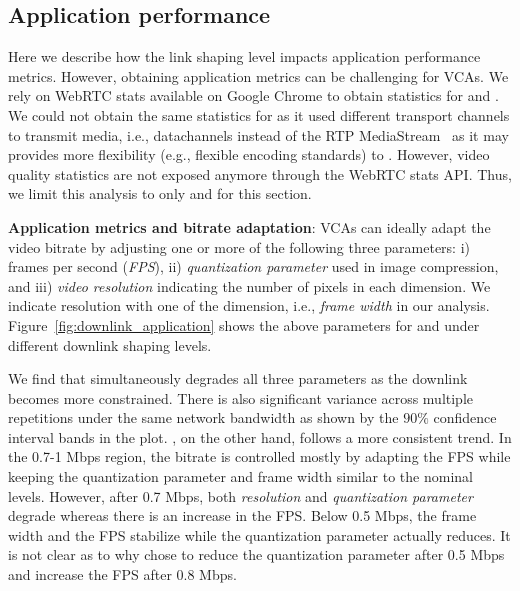 \subsection{Application performance}
Here we describe how the link shaping level impacts application performance metrics. However, obtaining application metrics can be challenging for VCAs. We rely on WebRTC stats available on Google Chrome to obtain statistics for \teamsbrowser and \meet. We could not obtain the same statistics for \zoombrowser as it used different transport channels to transmit media, i.e., datachannels instead of the RTP MediaStream~\cite{webrtc_stats} as it may provides more flexibility (e.g., flexible encoding standards) to \zoom. However, video quality statistics are not exposed anymore through the WebRTC stats API. %
Thus, we limit this analysis to only \meet and \teamsbrowser for this section. 






\textbf{Application metrics and bitrate adaptation}: VCAs can ideally adapt the video bitrate by adjusting one or more of the following three parameters: i) frames per second (\textit{FPS}), ii) \textit{quantization parameter} used in image compression, and  iii) \textit{video resolution} indicating the number of pixels in each dimension. We indicate resolution with one of the dimension, i.e., \textit{frame width} in our analysis. Figure~\ref{fig:downlink_application} shows the above parameters for \meet and \teamsbrowser under different downlink shaping levels. 




We find that \teamsbrowser simultaneously degrades all three parameters as the downlink becomes more constrained. There is also significant variance across multiple repetitions under the same network bandwidth as shown by the $90\%$ confidence interval bands in the plot. \meet, on the other hand, follows a more consistent trend. In the 0.7-1 Mbps region, the bitrate is controlled mostly by adapting the FPS while keeping the quantization parameter and frame width similar to the nominal levels. However, after 0.7 Mbps, both \textit{resolution} and \textit{quantization parameter} degrade whereas there is an increase in the FPS. Below 0.5 Mbps, the frame width and the FPS stabilize while the quantization parameter actually reduces. It is not clear as to why \meet chose to reduce the quantization parameter after 0.5 Mbps and increase the FPS after 0.8 Mbps. 

